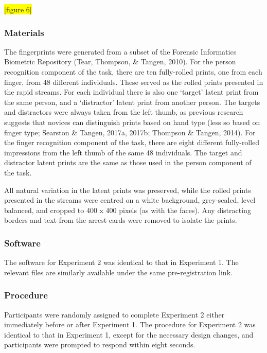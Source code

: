 \documentclass[
  english,
  man]{apa6}
\begin{document}
\colorbox{yellow}{[figure 6]}

\hypertarget{materials-1}{%
\subsubsection{Materials}\label{materials-1}}

The fingerprints were generated from a subset of the Forensic Informatics Biometric Repository (Tear, Thompson, \& Tangen, 2010). For the person recognition component of the task, there are ten fully-rolled prints, one from each finger, from 48 different individuals. These served as the rolled prints presented in the rapid streams. For each individual there is also one `target' latent print from the same person, and a `distractor' latent print from another person. The targets and distractors were always taken from the left thumb, as previous research suggests that novices can distinguish prints based on hand type (less so based on finger type; Searston \& Tangen, 2017a, 2017b; Thompson \& Tangen, 2014). For the finger recognition component of the task, there are eight different fully-rolled impressions from the left thumb of the same 48 individuals. The target and distractor latent prints are the same as those used in the person component of the task.

All natural variation in the latent prints was preserved, while the rolled prints presented in the streams were centred on a white background, grey-scaled, level balanced, and cropped to 400 x 400 pixels (as with the faces). Any distracting borders and text from the arrest cards were removed to isolate the prints.

\hypertarget{software-1}{%
\subsubsection{Software}\label{software-1}}

The software for Experiment 2 was identical to that in Experiment 1. The relevant files are similarly available under the same pre-registration link.

\hypertarget{procedure-1}{%
\subsubsection{Procedure}\label{procedure-1}}

Participants were randomly assigned to complete Experiment 2 either immediately before or after Experiment 1. The procedure for Experiment 2 was identical to that in Experiment 1, except for the necessary design changes, and participants were prompted to respond within eight seconds.
\end{document}
